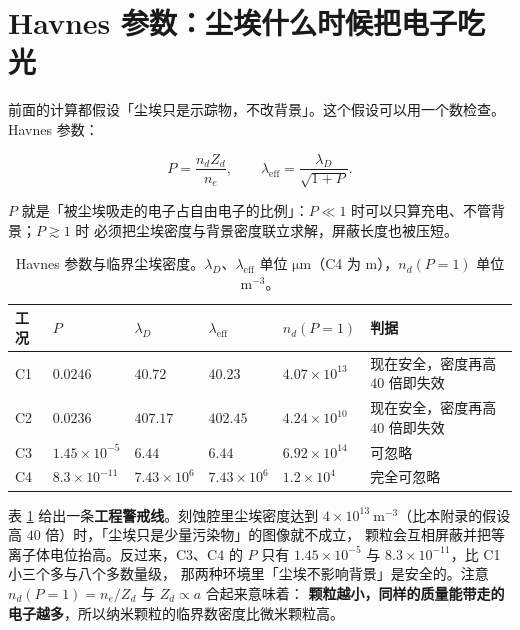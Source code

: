 \section{Havnes 参数：尘埃什么时候把电子吃光}
\label{sec:app-r-havnes}

前面的计算都假设「尘埃只是示踪物，不改背景」。这个假设可以用一个数检查。Havnes 参数：

\begin{equation}
  P = \frac{n_d Z_d}{n_e},
  \qquad
  \lambda_{\mathrm{eff}} = \frac{\lambda_D}{\sqrt{1+P}}.
  \label{eq:app-r-havnes}
\end{equation}

$P$ 就是「被尘埃吸走的电子占自由电子的比例」：$P\ll1$ 时可以只算充电、不管背景；$P\gtrsim1$ 时
必须把尘埃密度与背景密度联立求解，屏蔽长度也被压短。

\begin{table}[htbp]
  \centering
  \caption{Havnes 参数与临界尘埃密度。$\lambda_D$、$\lambda_{\mathrm{eff}}$ 单位
    $\mathrm{\mu m}$（C4 为 m），$n_d(P=1)$ 单位 $\mathrm{m^{-3}}$。}
  \label{tab:app-r-havnes}
  \begin{tabular}{@{}p{2.6cm}p{1.8cm}p{1.9cm}p{1.9cm}p{2.6cm}p{3.2cm}@{}}
    \toprule
    工况 & $P$ & $\lambda_D$ & $\lambda_{\mathrm{eff}}$ & $n_d(P=1)$ & 判据 \\
    \midrule
    C1 & $0.0246$ & $40.72$ & $40.23$ & $4.07\times10^{13}$ & 现在安全，密度再高 $40$ 倍即失效 \\
    C2 & $0.0236$ & $407.17$ & $402.45$ & $4.24\times10^{10}$ & 现在安全，密度再高 $40$ 倍即失效 \\
    C3 & $1.45\times10^{-5}$ & $6.44$ & $6.44$ & $6.92\times10^{14}$ & 可忽略 \\
    C4 & $8.3\times10^{-11}$ & $7.43\times10^{6}$ & $7.43\times10^{6}$ & $1.2\times10^{4}$ & 完全可忽略 \\
    \bottomrule
  \end{tabular}
\end{table}

表 \ref{tab:app-r-havnes} 给出一条\textbf{工程警戒线}。刻蚀腔里尘埃密度达到
$4\times10^{13}\ \mathrm{m^{-3}}$（比本附录的假设高 $40$ 倍）时，「尘埃只是少量污染物」的图像就不成立，
颗粒会互相屏蔽并把等离子体电位抬高。反过来，C3、C4 的 $P$ 只有 $1.45\times10^{-5}$ 与
$8.3\times10^{-11}$，比 C1 小三个多与八个多数量级，
那两种环境里「尘埃不影响背景」是安全的。注意 $n_d(P=1)=n_e/Z_d$ 与 $Z_d\propto a$ 合起来意味着：
\textbf{颗粒越小，同样的质量能带走的电子越多}，所以纳米颗粒的临界数密度比微米颗粒高。

